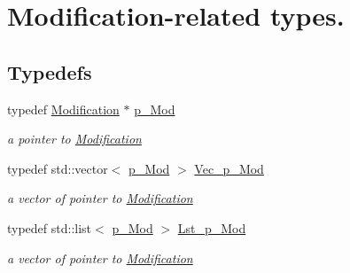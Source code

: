 \hypertarget{group___modification___t_y_p_e_s}{}\section{Modification-\/related types.}
\label{group___modification___t_y_p_e_s}
\subsection*{Typedefs}
\begin{DoxyCompactItemize}
\item 
\mbox{\label{group___modification___t_y_p_e_s_ga0cc1ca46966ce3aebbe7f109241baf66}} 
typedef \mbox{\hyperlink{class_s_m_spp__di__unipi__it_1_1_modification}{Modification}} $\ast$ \mbox{\hyperlink{group___modification___t_y_p_e_s_ga0cc1ca46966ce3aebbe7f109241baf66}{p\+\_\+\+Mod}}
\begin{DoxyCompactList}\small\item\em a pointer to \mbox{\hyperlink{class_s_m_spp__di__unipi__it_1_1_modification}{Modification}} \end{DoxyCompactList}\item 
\mbox{\label{group___modification___t_y_p_e_s_gaf929e6708a135742b2152b3f4ab011bc}} 
typedef std\+::vector$<$ \mbox{\hyperlink{group___modification___t_y_p_e_s_ga0cc1ca46966ce3aebbe7f109241baf66}{p\+\_\+\+Mod}} $>$ \mbox{\hyperlink{group___modification___t_y_p_e_s_gaf929e6708a135742b2152b3f4ab011bc}{Vec\+\_\+p\+\_\+\+Mod}}
\begin{DoxyCompactList}\small\item\em a vector of pointer to \mbox{\hyperlink{class_s_m_spp__di__unipi__it_1_1_modification}{Modification}} \end{DoxyCompactList}\item 
\mbox{\label{group___modification___t_y_p_e_s_ga84d50ff1c2c6487f884224ee0341160f}} 
typedef std\+::list$<$ \mbox{\hyperlink{group___modification___t_y_p_e_s_ga0cc1ca46966ce3aebbe7f109241baf66}{p\+\_\+\+Mod}} $>$ \mbox{\hyperlink{group___modification___t_y_p_e_s_ga84d50ff1c2c6487f884224ee0341160f}{Lst\+\_\+p\+\_\+\+Mod}}
\begin{DoxyCompactList}\small\item\em a vector of pointer to \mbox{\hyperlink{class_s_m_spp__di__unipi__it_1_1_modification}{Modification}} \end{DoxyCompactList}\item 

\end{DoxyCompactItemize}
